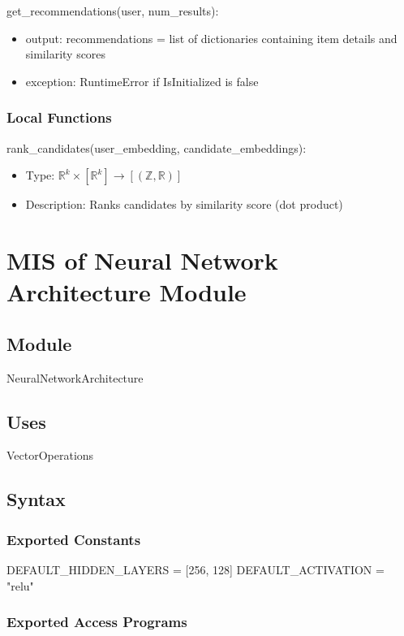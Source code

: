 \documentclass[12pt, titlepage]{article}
\begin{document}
\noindent get\_recommendations(user, num\_results):
\begin{itemize}
\item output: recommendations = list of dictionaries containing item details and similarity scores
\item exception: RuntimeError if IsInitialized is false
\end{itemize}

\subsubsection{Local Functions}
rank\_candidates(user\_embedding, candidate\_embeddings):
\begin{itemize}
  \item Type: $\mathbb{R}^k \times [\mathbb{R}^k] \rightarrow [(\mathbb{Z},\mathbb{R})]$
  \item Description: Ranks candidates by similarity score (dot product)
\end{itemize}

\section{MIS of Neural Network Architecture Module} \label{ModuleNNA}

\subsection{Module}

NeuralNetworkArchitecture

\subsection{Uses}
VectorOperations

\subsection{Syntax}

\subsubsection{Exported Constants}
DEFAULT\_HIDDEN\_LAYERS = [256, 128]
DEFAULT\_ACTIVATION = "relu"
\subsubsection{Exported Access Programs}
\end{document}

